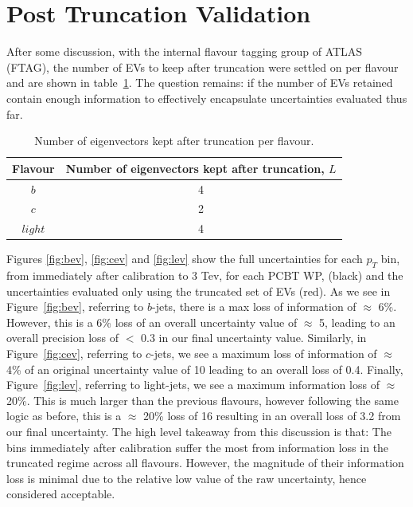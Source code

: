\section{Post Truncation Validation}
After some discussion, with the internal flavour tagging group of ATLAS (FTAG), the number of EVs to keep after truncation were settled on per flavour and are shown in table~\ref{table:EV}. The question remains: if the number of EVs retained contain enough information to effectively encapsulate uncertainties evaluated thus far.
\begin{center}
\begin{table}[h!]

    \centering
    \begin{tabular}{|c|c|}

    \hline
     Flavour&Number of eigenvectors
kept after truncation, $L$\\
    \hline
        $b$&4  \\
         $c$&2 \\
          $light$&4\\
         \hline
    \end{tabular}
    \caption{Number of eigenvectors kept after truncation per flavour.}
        \label{table:EV}
\end{table}
\end{center}
Figures \ref{fig:bev}, \ref{fig:cev} and \ref{fig:lev} show the full uncertainties for each $p_T$ bin, from immediately after calibration to 3 Tev, for each PCBT  WP, (black) and the uncertainties evaluated only using the truncated  set of EVs (red). As we see in Figure~\ref{fig:bev}, referring to $b$-jets, there is a max loss of information of $\approx$ 6\%. However, this is a 6\% loss of an overall uncertainty value of $\approx$ 5, leading to an overall precision loss of $<$ 0.3 in our final uncertainty value. Similarly, in Figure~\ref{fig:cev}, referring to $c$-jets, we see a maximum loss of information of $\approx$ 4\% of an original uncertainty value of 10 leading to an overall loss of 0.4. Finally, Figure~\ref{fig:lev}, referring to light-jets, we see a maximum information loss of $\approx$ 20\%. This is much larger than the previous flavours, however following the same logic as before, this is a $\approx$ 20\% loss of 16 resulting in an overall loss of 3.2 from our final uncertainty. The high level takeaway from this discussion is that: The bins immediately after calibration suffer the most from information loss in the truncated regime across all flavours. However, the magnitude of their information loss is minimal  due to the relative low value of the raw uncertainty, hence considered acceptable. 
